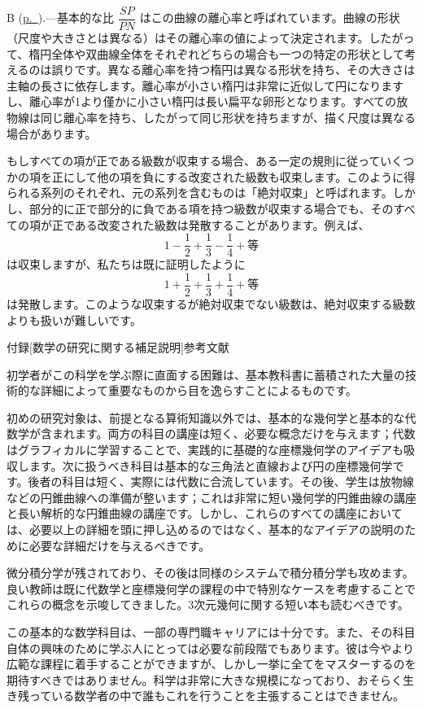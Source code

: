 \documentclass[a4paper,11pt,openany]{ltjsbook}
\providecommand{\Note}[1]{#1\Pagelabel{note#1}}
\providecommand{\Pagelabel}[2][page]{\phantomsection\label{#1:#2}}
\providecommand{\Pageref}[2][p.]{\hyperref[page:#2]{#1~\pageref*{page:#2}}}
\begin{document}
\Note{B} (\Pageref{136}).---基本的な比 $\dfrac{SP}{PN}$ はこの曲線の離心率と呼ばれています。曲線の形状（尺度や大きさとは異なる）はその離心率の値によって決定されます。したがって、楕円全体や双曲線全体をそれぞれどちらの場合も一つの特定の形状として考えるのは誤りです。異なる離心率を持つ楕円は異なる形状を持ち、その大きさは主軸の長さに依存します。離心率が小さい楕円は非常に近似して円になりますし、離心率が1より僅かに小さい楕円は長い扁平な卵形となります。すべての放物線は同じ離心率を持ち、したがって同じ形状を持ちますが、描く尺度は異なる場合があります。

もしすべての項が正である級数が収束する場合、ある一定の規則に従っていくつかの項を正にして他の項を負にする改変された級数も収束します。このように得られる系列のそれぞれ、元の系列を含むものは「絶対収束」と呼ばれます。しかし、部分的に正で部分的に負である項を持つ級数が収束する場合でも、そのすべての項が正である改変された級数は発散することがあります。例えば、
\[
1 - \frac{1}{2} + \frac{1}{3} - \frac{1}{4} + \text{等}
\]
は収束しますが、私たちは既に証明したように
\[
1 + \frac{1}{2} + \frac{1}{3} + \frac{1}{4} + \text{等}
\]
は発散します。このような収束するが絶対収束でない級数は、絶対収束する級数よりも扱いが難しいです。

付録[数学の研究に関する補足説明]{参考文献}

初学者がこの科学を学ぶ際に直面する困難は、基本教科書に蓄積された大量の技術的な詳細によって重要なものから目を逸らすことによるものです。

初めの研究対象は、前提となる算術知識以外では、基本的な幾何学と基本的な代数学が含まれます。両方の科目の講座は短く、必要な概念だけを与えます；代数はグラフィカルに学習することで、実践的に基礎的な座標幾何学のアイデアも吸収します。次に扱うべき科目は基本的な三角法と直線および円の座標幾何学です。後者の科目は短く、実際には代数に合流しています。その後、学生は放物線などの円錐曲線への準備が整います；これは非常に短い幾何学的円錐曲線の講座と長い解析的な円錐曲線の講座です。しかし、これらのすべての講座においては、必要以上の詳細を頭に押し込めるのではなく、基本的なアイデアの説明のために必要な詳細だけを与えるべきです。

微分積分学が残されており、その後は同様のシステムで積分積分学も攻めます。良い教師は既に代数学と座標幾何学の課程の中で特別なケースを考慮することでこれらの概念を示唆してきました。3次元幾何に関する短い本も読むべきです。

この基本的な数学科目は、一部の専門職キャリアには十分です。また、その科目自体の興味のために学ぶ人にとっては必要な前段階でもあります。彼は今やより広範な課程に着手することができますが、しかし一挙に全てをマスターするのを期待すべきではありません。科学は非常に大きな規模になっており、おそらく生き残っている数学者の中で誰もこれを行うことを主張することはできません。
\end{document}
